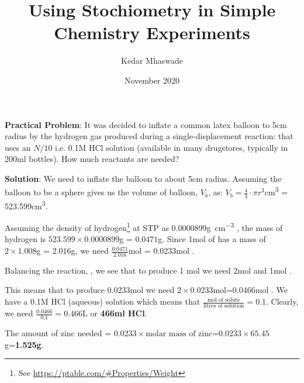 \documentclass[12pt]{article}
\begin{document}
\title{Using Stochiometry in Simple Chemistry Experiments}
\author{Kedar Mhaswade}
\date{November 2020}
\maketitle
\textbf{Practical Problem}: 
It was decided to inflate a common latex balloon to 5cm radius by the hydrogen gas produced during a single-displacement reaction:  that uses an $N/10$ i.e. 0.1M HCl solution (available in many drugstores, typically in 200ml bottles). How much reactants are needed?

\textbf{Solution}:
We need to inflate the balloon to about 5cm radius. Assuming the balloon to be a sphere gives us the volume of balloon, $V_b$, as:
$ V_b = {\frac{4}{3}\cdot \pi r^3}$\si{\cubic\centi\metre} = 523.599\si{\cubic\centi\metre}.

Assuming the density of hydrogen\footnote{See \url{https://ptable.com/\#Properties/Weight}} at STP as 0.0000899\si{\gram\per\cubic\centi\metre} , the mass of hydrogen is $523.599\times 0.0000899$\si{\g} = $0.0471$\si{\gram}. Since 1\si{\mol} of  has a mass of $2\times 1.008$\si{\gram} = $2.016$\si{\gram}, we need 
$\frac{0.0471}{2.016}$\si{\mol} = 0.0233\si{\mol} .

Balancing the reaction, 
, 
we see that to produce 1 mol  we need 2\si{\mol}  and 1\si{\mol} .

This means that to produce 0.0233\si{\mol}  we need $2\times0.0233$\si{\mol}=0.0466\si{\mol} . We have a 0.1M HCl (aqueous) solution which means that $\frac{\text{mol of solute}}{\text{litres of solution}} = 0.1$. Clearly, we need $\frac{0.0466}{0.1} = 0.466$\si{L} or \textbf{466\si{ml} HCl}.

The amount of zinc needed = $0.0233\times\text{molar mass of zinc}$=$0.0233\times 65.45$\si{g}=\textbf{1.525\si{g}}.

\let\thefootnote\relax{}
\end{document}
